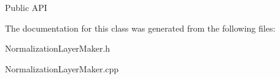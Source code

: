 \begin{DoxyParagraph}{Public A\-P\-I}

\end{DoxyParagraph}


The documentation for this class was generated from the following files\-:\begin{DoxyCompactItemize}
\item 
Normalization\-Layer\-Maker.\-h\item 
Normalization\-Layer\-Maker.\-cpp\end{DoxyCompactItemize}
